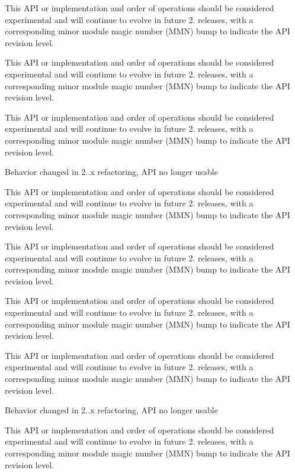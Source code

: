 \begin{DoxyRefList}
This A\+PI or implementation and order of operations should be considered experimental and will continue to evolve in future 2. releases, with a corresponding minor module magic number (M\+MN) bump to indicate the A\+PI revision level. 

This A\+PI or implementation and order of operations should be considered experimental and will continue to evolve in future 2. releases, with a corresponding minor module magic number (M\+MN) bump to indicate the A\+PI revision level. 

This A\+PI or implementation and order of operations should be considered experimental and will continue to evolve in future 2. releases, with a corresponding minor module magic number (M\+MN) bump to indicate the A\+PI revision level. 

Behavior changed in 2..\+x refactoring, A\+PI no longer usable  
\item[\label{bug__bug000003}%
\hypertarget{bug__bug000003}{}%
Global \hyperlink{group__APACHE__CORE__MUTEX_ga354bb6f9a53786fa1259e061ced592e2}{A\+P\+\_\+\+D\+E\+C\+L\+A\+RE} (apr\+\_\+status\+\_\+t) ap\+\_\+parse\+\_\+mutex(const char $\ast$arg]This A\+PI or implementation and order of operations should be considered experimental and will continue to evolve in future 2. releases, with a corresponding minor module magic number (M\+MN) bump to indicate the A\+PI revision level. 

This A\+PI or implementation and order of operations should be considered experimental and will continue to evolve in future 2. releases, with a corresponding minor module magic number (M\+MN) bump to indicate the A\+PI revision level. 

This A\+PI or implementation and order of operations should be considered experimental and will continue to evolve in future 2. releases, with a corresponding minor module magic number (M\+MN) bump to indicate the A\+PI revision level. 

This A\+PI or implementation and order of operations should be considered experimental and will continue to evolve in future 2. releases, with a corresponding minor module magic number (M\+MN) bump to indicate the A\+PI revision level. 

Behavior changed in 2..\+x refactoring, A\+PI no longer usable  
\item[\label{bug__bug000003}%
\hypertarget{bug__bug000003}{}%
Global \hyperlink{group__APACHE__CORE__MUTEX_ga354bb6f9a53786fa1259e061ced592e2}{A\+P\+\_\+\+D\+E\+C\+L\+A\+RE} (apr\+\_\+status\+\_\+t) ap\+\_\+parse\+\_\+mutex(const char $\ast$arg]This A\+PI or implementation and order of operations should be considered experimental and will continue to evolve in future 2. releases, with a corresponding minor module magic number (M\+MN) bump to indicate the A\+PI revision level. 


\end{DoxyRefList}

